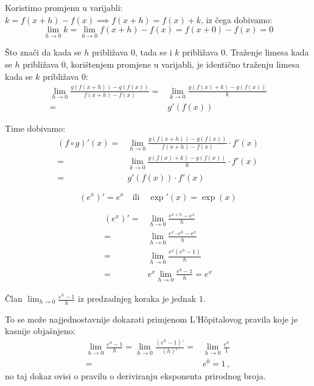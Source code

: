 Koristimo promjenu u varijabli: $k = f(x+h) - f(x) \implies f(x+h) = f(x) + k$,
iz čega dobivamo:
$$
\lim_{h\to 0} k = \lim_{h\to 0} f(x+h) - f(x) = f(x+0) - f(x) = 0
$$

Što znači da kada se $h$ približava $0$, tada se i $k$ približava $0$. Traženje
limesa kada se $h$ približava $0$, korištenjem promjene u varijabli, je
identično traženju limesa kada se $k$ približava $0$:
\begin{align*}
    \lim_{h\to 0} \frac{g(f(x+h)) - g(f(x))}{f(x+h) - f(x)}
    =& \lim_{k\to 0} \frac{g(f(x) + k) - g(f(x))}{k}\\
    =& g'(f(x))
\end{align*}

Time dobivamo:
\begin{align*}
    (f \circ g)'(x) =& \lim_{h \to 0} \frac{g(f(x+h))-g(f(x))}{f(x+h)-f(x)} \cdot f'(x)\\
    =& \lim_{k\to 0} \frac{g(f(x) + k) - g(f(x))}{k} \cdot f'(x)\\
    =& g'(f(x)) \cdot f'(x)
\end{align*}

\pagebreak

\begin{proposition}
    $$
        (e^x)' = e^x\quad \text{ili} \quad \exp'(x) = \exp(x)
    $$
\end{proposition}

\begin{multicols}{2}
\begin{align*}
    (e^x)' =& \lim_{h\to 0 } \frac{e^{x+h} - e^x}{h}\\
    =& \lim_{h\to 0} \frac{e^x \cdot e^h - e^x}{h}\\
    =& \lim_{h\to 0} \frac{e^x (e^h - 1)}{h}\\
    =& e^x \lim_{h\to 0} \frac{e^h - 1}{h} = e^x
\end{align*}

\columnbreak

\noindent
Član $\lim_{h\to 0} \frac{e^h - 1}{h}$ iz predzadnjeg koraka je jednak $1$.

To se može najjednostavnije dokazati primjenom L'Hôpitalovog pravila koje je
kasnije objašnjeno:
\begin{align*}
    \lim_{h\to 0} \frac{e^h - 1}{h} = \lim_{h\to 0} \frac{(e^h - 1)'}{(h)'} =& \lim_{h\to 0} \frac{e^h}{1}\\
    =& e^0 = 1\,,
\end{align*}
no taj dokaz ovisi o pravilu o deriviranju eksponenta prirodnog broja.

\end{multicols}

